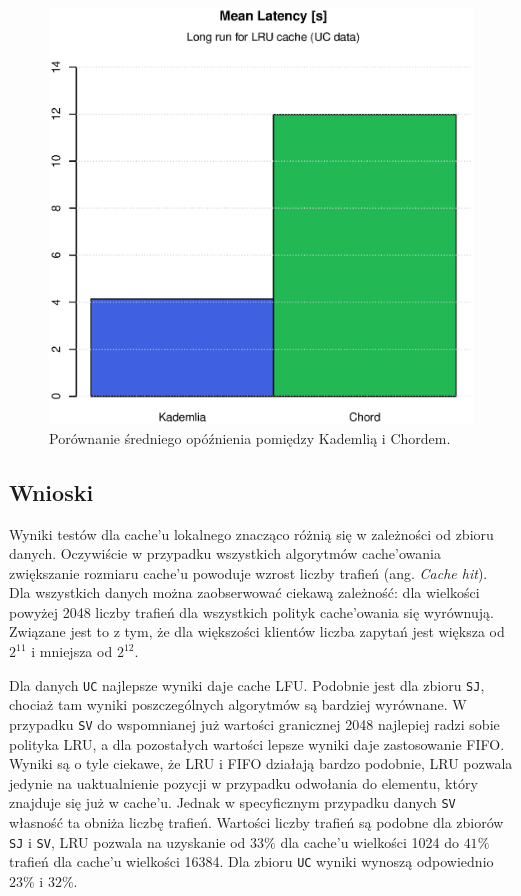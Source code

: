 \documentclass[a4paper,11pt]{scrartcl}
\newcommand{\f}{\texttt}
\newcommand{\s}{ }
\newcommand{\kesz}{cache}
\newcommand{\keszu}{cache'u}
\newcommand{\keszowania}{cache'owania}
\begin{document}
\begin{figure}[h!]
\centering
\includegraphics[width=0.7\linewidth]{img/tests/long_latency_1.eps}
\caption{Porównanie średniego opóźnienia pomiędzy Kademlią i Chordem.}
\label{fig_latency}
\end{figure}

\subsection{Wnioski}

Wyniki testów dla \keszu\s lokalnego znacząco różnią się w zależności od zbioru danych. Oczywiście w przypadku wszystkich algorytmów \keszowania\s zwiększanie rozmiaru \keszu\s powoduje wzrost liczby trafień (ang. \textit{Cache hit}). Dla wszystkich danych można zaobserwować ciekawą zależność: dla wielkości powyżej 2048 liczby trafień dla wszystkich polityk \keszowania\s się wyrównują. Związane jest to z tym, że dla większości klientów liczba zapytań jest większa od $2^{11}$ i mniejsza od $2^{12}$.

Dla danych \f{UC} najlepsze wyniki daje \kesz\s LFU. Podobnie jest dla zbioru \f{SJ}, chociaż tam wyniki poszczególnych algorytmów są bardziej wyrównane. W przypadku \f{SV} do wspomnianej już wartości granicznej 2048 najlepiej radzi sobie polityka LRU, a dla pozostałych wartości lepsze wyniki daje zastosowanie FIFO. Wyniki są o tyle ciekawe, że LRU i FIFO działają bardzo podobnie, LRU pozwala jedynie na uaktualnienie pozycji w przypadku odwołania do elementu, który znajduje się już w \keszu. Jednak w specyficznym przypadku danych \f{SV} własność ta obniża liczbę trafień.
Wartości liczby trafień są podobne dla zbiorów \f{SJ} i \f{SV}, LRU pozwala na uzyskanie od $33\%$ dla \keszu\s wielkości 1024 do $41\%$ trafień dla \keszu\s wielkości 16384. Dla zbioru \f{UC} wyniki wynoszą odpowiednio $23\%$ i $32\%$.
\end{document}
